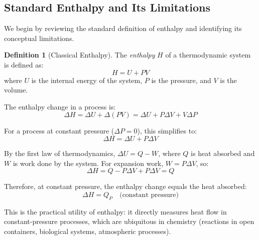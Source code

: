 \documentclass[12pt,a4paper]{article}
\theoremstyle{definition}
\newtheorem{definition}[theorem]{Definition}
\theoremstyle{remark}
\begin{document}
\subsection{Standard Enthalpy and Its Limitations}

We begin by reviewing the standard definition of enthalpy and identifying its conceptual limitations.

\begin{definition}[Classical Enthalpy]
\label{def:classical_enthalpy}
The \emph{enthalpy} $H$ of a thermodynamic system is defined as:
\begin{equation}
H = U + PV
\end{equation}
where $U$ is the internal energy of the system, $P$ is the pressure, and $V$ is the volume.
\end{definition}

The enthalpy change in a process is:
\begin{equation}
\Delta H = \Delta U + \Delta(PV) = \Delta U + P\Delta V + V\Delta P
\end{equation}

For a process at constant pressure ($\Delta P = 0$), this simplifies to:
\begin{equation}
\Delta H = \Delta U + P\Delta V
\end{equation}

By the first law of thermodynamics, $\Delta U = Q - W$, where $Q$ is heat absorbed and $W$ is work done by the system. For expansion work, $W = P\Delta V$, so:
\begin{equation}
\Delta H = Q - P\Delta V + P\Delta V = Q
\end{equation}

Therefore, at constant pressure, the enthalpy change equals the heat absorbed:
\begin{equation}
\Delta H = Q_P \quad \text{(constant pressure)}
\end{equation}

This is the practical utility of enthalpy: it directly measures heat flow in constant-pressure processes, which are ubiquitous in chemistry (reactions in open containers, biological systems, atmospheric processes).
\end{document}
